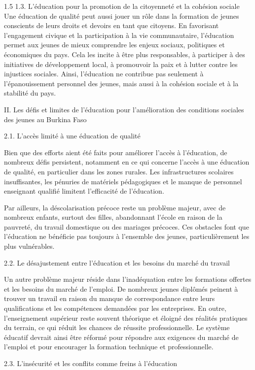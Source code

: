 \documentclass[12pt]{article}
\begin{document}
\begin{spacing}{1.5}
1.3. L'éducation pour la promotion de la citoyenneté et la cohésion sociale  
Une éducation de qualité peut aussi jouer un rôle dans la formation de jeunes conscients de leurs droits et devoirs en tant que citoyens. En favorisant l'engagement civique et la participation à la vie communautaire, l'éducation permet aux jeunes de mieux comprendre les enjeux sociaux, politiques et économiques du pays. Cela les incite à être plus responsables, à participer à des initiatives de développement local, à promouvoir la paix et à lutter contre les injustices sociales. Ainsi, l'éducation ne contribue pas seulement à l'épanouissement personnel des jeunes, mais aussi à la cohésion sociale et à la stabilité du pays.

II. Les défis et limites de l'éducation pour l'amélioration des conditions sociales des jeunes au Burkina Faso

2.1. L'accès limité à une éducation de qualité
  
Bien que des efforts aient été faits pour améliorer l'accès à l'éducation, de nombreux défis persistent, notamment en ce qui concerne l'accès à une éducation de qualité, en particulier dans les zones rurales. Les infrastructures scolaires insuffisantes, les pénuries de matériels pédagogiques et le manque de personnel enseignant qualifié limitent l'efficacité de l'éducation.

 Par ailleurs, la déscolarisation précoce reste un problème majeur, avec de nombreux enfants, surtout des filles, abandonnant l'école en raison de la pauvreté, du travail domestique ou des mariages précoces. Ces obstacles font que l'éducation ne bénéficie pas toujours à l'ensemble des jeunes, particulièrement les plus vulnérables.

2.2. Le désajustement entre l'éducation et les besoins du marché du travail
  
Un autre problème majeur réside dans l'inadéquation entre les formations offertes et les besoins du marché de l'emploi. De nombreux jeunes diplômés peinent à trouver un travail en raison du manque de correspondance entre leurs qualifications et les compétences demandées par les entreprises. En outre, l'enseignement supérieur reste souvent théorique et éloigné des réalités pratiques du terrain, ce qui réduit les chances de réussite professionnelle. Le système éducatif devrait ainsi être réformé pour répondre aux exigences du marché de l'emploi et pour encourager la formation technique et professionnelle.

2.3. L'insécurité et les conflits comme freins à l'éducation
 

\end{spacing}
\end{document}
